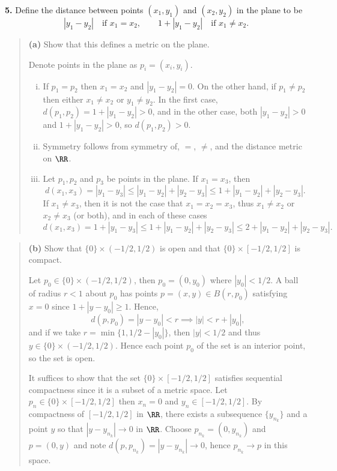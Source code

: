 \documentclass{homework}
\begin{document}
{\bf 5.} Define the distance between points $(x_1,y_1)$ and $(x_2,y_2)$ in the plane to be
$$
  |y_1-y_2|\quad\text{if }x_1=x_2,\quad\quad 1+|y_1-y_2|\quad\text{if }x_1\not=x_2.
$$
\begin{quote}
  {\bf (a)} Show that this defines a metric on the plane.
  \begin{solution} 
    Denote points in the plane as $p_i = (x_i,y_i)$.  
    \begin{enumerate}[i)]
      \item If $p_1 = p_2$ then $x_1 = x_2$ and $|y_1 - y_2| = 0$.  On the other hand, if $p_1 \not= p_2$ then either $x_1 \not= x_2$ or $y_1 \not= y_2$.  In the first case, $d(p_1,p_2) = 1 + |y_1 - y_2| > 0$, and in the other case, both $|y_1 - y_2| > 0$ and $1 + |y_1 - y_2| > 0$, so $d(p_1,p_2) >0$.
      \item Symmetry follows from symmetry of, $=$, $\not=$, and the distance metric on $\RR$.
      \item Let $p_1,p_2$ and $p_3$ be points in the plane.  If $x_1=x_3$, then 
      $$
	d(x_1,x_3) = |y_1 - y_3| \le |y_1 - y_2| + |y_2 - y_3| \le 1 + |y_1 - y_2| +|y_2 - y_3|.
      $$
      If $x_1\not=x_3$, then it is not the case that $x_1=x_2=x_3$, thus $x_1\not=x_2$ or $x_2\not=x_3$ (or both), and in each of these cases
      $$
	d(x_1,x_3) = 1 + |y_1 - y_3| \le 1 + |y_1 - y_2| + |y_2 - y_3| \le 2 + |y_1 - y_2| + |y_2 - y_3|.
      $$
    \end{enumerate}
  \end{solution}
\end{quote}
\begin{quote}
  {\bf (b)} Show that $\{0\}\times (-1/2,1/2)$ is open and that $\{0\}\times [-1/2,1/2]$ is compact.  
  \begin{solution}
    Let $p_0 \in \{0\}\times (-1/2,1/2)$, then $p_0 = (0,y_0)$ where $|y_0|<1/2$.  A ball of radius
    $r<1$ about $p_0$ has points $p=(x,y)\in B(r,p_0)$ satisfying $x=0$ since $1+|y-y_0| \ge 1$.  Hence,
    $$
      d(p,p_0) = |y-y_0| < r\implies |y|< r + |y_0|,
    $$
    and if we take $r=\min\{1,1/2-|y_0|\}$, then $|y|<1/2$ and thus
    $y\in\{0\}\times (-1/2,1/2)$. Hence each point $p_0$ of the set is an
    interior point, so the set is open.

    It suffices to show that the set $\{0\}\times [-1/2,1/2]$ satisfies
    sequential compactness since it is a subset of a metric space. Let 
    $p_n \in \{0\}\times [-1/2,1/2]$ then $x_n =0$ and $y_n \in [-1/2,1/2]$. 
    By compactness of $[-1/2,1/2]$ in $\RR$, there exists a subsequence 
    $\{y_{n_k}\}$ and a point $y$ so that $|y-y_{n_k}|\to 0$ in $\RR$. Choose
    $p_{n_k} = (0,y_{n_k})$ and $p = (0,y)$ and note $d(p,p_{n_k}) = |y-y_{n_k}| \to 0$,
    hence $p_{n_k}\to p$ in this space.
  \end{solution}
\end{quote}
\end{document}
